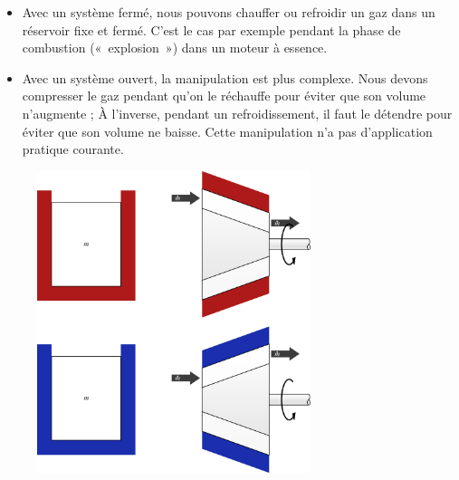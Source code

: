		\begin{itemize}
			\item Avec un système fermé, nous pouvons chauffer ou refroidir un gaz dans un réservoir fixe et fermé. C’est le cas par exemple pendant la phase de combustion («~explosion~») dans un moteur à essence.
			\item Avec un système ouvert, la manipulation est plus complexe. Nous devons compresser le gaz pendant qu’on le réchauffe pour éviter que son volume n’augmente ; À l’inverse, pendant un refroidissement, il faut le détendre pour éviter que son volume ne baisse. Cette manipulation n’a pas d’application pratique courante.
		\end{itemize}	
		
		\begin{figure}
			\begin{center}
				\includegraphics[width=8cm]{images/volume_constant.png}
			\end{center}
			\label{fig_gp_volume_constant}
		\end{figure}
		
